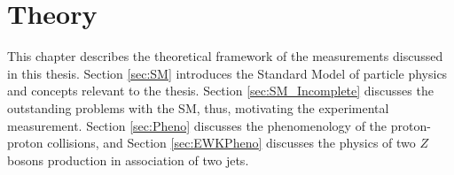 \part{\LARGE{Theory}}
\label{sec:theory}

This chapter describes the theoretical framework of the measurements discussed in this thesis. Section  \ref{sec:SM} introduces the Standard Model of particle physics and concepts relevant to the thesis. Section \ref{sec:SM_Incomplete} discusses the outstanding problems with the SM, thus, motivating the experimental measurement. Section \ref{sec:Pheno} discusses the phenomenology of the proton-proton collisions, and Section \ref{sec:EWKPheno} discusses the physics of two $Z$ bosons production in association of two jets. 